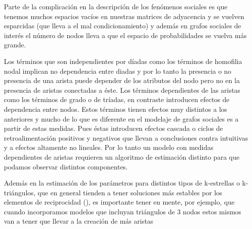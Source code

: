 Parte de la complicación en la descripción de los fenómenos sociales es que tenemos muchos espacios vacíos en nuestras matrices de adyacencia y se vuelven esparcidas (que lleva a el mal condicionamiento) y además en grafos sociales de interés el número de nodos lleva a que el espacio de probabilidades se vuelva más grande.

Los términos que son independientes por díadas como los términos de homofilia nodal implican no dependencia entre diadas y por lo tanto la presencia o no presencia de una arista puede depender de los atributos del nodo pero no en la presencia de aristas conectadas a éste. Los términos dependientes de las aristas como los términos de grado o de tríadas, en contraste introducen efectos de dependencia entre nodos. Estos términos tienen efectos muy distintos a los anteriores y mucho de lo que es diferente en el modelaje de grafos sociales es a partir de estas medidas. Pues éstas introducen efectos cascada o ciclos de retroalimentación positivos y negativos que llevan a conclusiones contra intuitivas y a efectos altamente no lineales. Por lo tanto un modelo con medidas dependientes de aristas requieren un algoritmo de estimación distinto para que podamos observar distintos componentes.


Además en la estimación de los parámetros para distintos tipos de k-estrellas o k-triángulos, que en general tienden a tener soluciones más estables por los elementos de reciprocidad (\cite{BirdsFeather}),  es importante tener en mente, por ejemplo, que cuando incorporamos modelos que incluyan triángulos de 3 nodos estos mismos van a tener que llevar a la creación de más aristas


